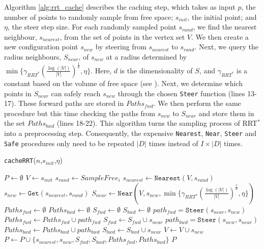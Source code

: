 \documentclass[letterpaper, 10 pt, conference]{ieeeconf}
\begin{document}
Algorithm \ref{alg:rrt_cache} describes the caching step, which takes as input $p$, the number of points to randomly sample from free space; $s_{init}$, the initial point; and $\eta$, the steer step size. For each randomly sampled point $s_{rand}$, we find the nearest neighbour, $s_{nearest}$, from the set of points in the vertex set $V$. We then create a new configuration point $s_{new}$ by steering from $s_{nearest}$ to $s_{rand}$. Next, we query the radius neighbours, $S_{near}$, of $s_{new}$ at a radius determined by  $\min\{\gamma_{RRT^*}(\frac{\log(|V|)}{|V|})^{\frac{1}{d}},\eta\}$. Here, $d$ is the dimensionality of $S$, and $\gamma_{RRT^*}$ is a constant based on the volume of free space (see \cite{karaman2011sampling}).  Next, we determine which points in $S_{near}$ can safely reach $s_{new}$ through the chosen \texttt{Steer} function (lines 13-17). These forward paths are stored in $Paths_{fwd}$. We then perform the same procedure but this time checking the paths from $s_{new}$ to $S_{near}$ and store them in the set $Paths_{bwd}$ (lines 18-22). This algorithm turns the sampling process of RRT$^*$  into a preprocessing step. Consequently, the expensive \texttt{Nearest}, \texttt{Near}, \texttt{Steer} and \texttt{Safe} procedures only need to be repeated $|D|$ times instead of $I\times|D|$ times.


	\begin{algorithm}
 	\scriptsize
	\caption{\small \texttt{cacheRRT}($n$,$s_{init}$,$\eta$)}
	\label{alg:rrt_cache}
	\begin{algorithmic}[1]
	\STATE $P \gets \emptyset$ \hfill {}
	\STATE $V \gets {s_{init}}$
	\STATE $s_{rand} \gets SampleFree_i$
	\STATE $s_{nearest} \gets \texttt{Nearest}(V,s_{rand})$
	\STATE $s_{new} \gets \texttt{Get}(s_{nearest},s_{rand})$
	\STATE $S_{near} \gets \texttt{Near}(V,{s_{new}},\min\{\gamma_{RRT^*}(\frac{\log(|V|)}{|V|})^{\frac{1}{d}},\eta\})$
	\STATE $Paths_{fwd} \gets \emptyset$
	\STATE $Paths_{bwd} \gets \emptyset$
	\STATE $S_{fwd} \gets \emptyset$
	\STATE $S_{bwd} \gets \emptyset$
	\STATE $path_{fwd} = \texttt{Steer}(s_{near},s_{new})$
	\STATE $Paths_{fwd} \gets Paths_{fwd} \cup path_{fwd}$
	\STATE $S_{fwd} \gets S_{fwd} \cup s_{near}$
	\ENDIF
	\STATE $path_{bwd} = \texttt{Steer}(s_{new},s_{near})$
	\STATE $Paths_{bwd} \gets Paths_{bwd} \cup path_{bwd}$
	\STATE $S_{bwd} \gets S_{bwd} \cup s_{near}$
	\ENDIF
	\ENDFOR
	\STATE $V\gets V \cup s_{new}$
	\STATE $P \gets P \cup \{s_{nearest},s_{new},S_{fwd},S_{bwd},Paths_{fwd},Paths_{bwd}\}$
	\ENDFOR
	\RETURN $P$
	\end{algorithmic}

	\end{algorithm}
\end{document}
